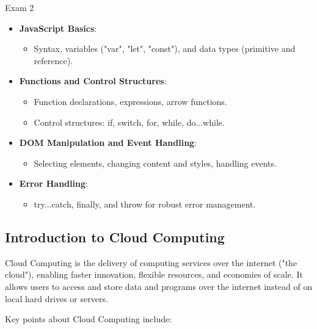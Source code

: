 \begin{examnotes}{Exam 2}
\begin{highlight}
        \begin{itemize}
            \item \textbf{JavaScript Basics}:
                \begin{itemize}
                    \item Syntax, variables ("var", "let", "const"), and data types (primitive and reference).
                \end{itemize}
            \item \textbf{Functions and Control Structures}:
                \begin{itemize}
                    \item Function declarations, expressions, arrow functions.
                    \item Control structures: if, switch, for, while, do...while.
                \end{itemize}
            \item \textbf{DOM Manipulation and Event Handling}:
                \begin{itemize}
                    \item Selecting elements, changing content and styles, handling events.
                \end{itemize}
            \item \textbf{Error Handling}:
                \begin{itemize}
                    \item try...catch, finally, and throw for robust error management.
                \end{itemize}
        \end{itemize}
    \end{highlight}

    \subsection*{Introduction to Cloud Computing}

    Cloud Computing is the delivery of computing services over the internet ("the cloud"), enabling faster innovation, flexible resources, and economies of scale. It allows users to access and store 
    data and programs over the internet instead of on local hard drives or servers.
    
    \begin{highlight}
        Key points about Cloud Computing include:
        

\end{highlight}
\end{examnotes}
